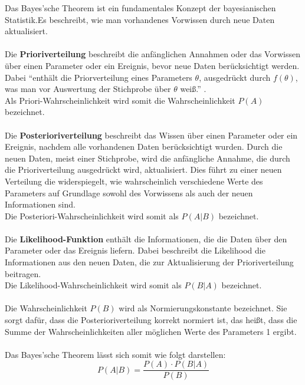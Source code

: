\documentclass[a4paper,12pt]{article}
\begin{document}
Das Bayes'sche Theorem ist ein fundamentales Konzept der bayesianischen Statistik.Es beschreibt, wie man vorhandenes Vorwissen durch neue Daten aktualisiert. \\\\
Die \textbf{Prioriverteilung} beschreibt die anfänglichen Annahmen oder das Vorwissen über einen 
Parameter oder ein Ereignis, bevor neue Daten berücksichtigt werden.
Dabei ``enthält die Priorverteilung eines Parameters $\theta$, ausgedrückt durch $f (\theta) $, 
was man vor Auswertung der Stichprobe über $\theta$ weiß.'' \parencite[90]{StatistikKlassischOderBayes}. \\
Als Priori-Wahrscheinlichkeit wird somit die Wahrscheinlichkeit $ P(A) $ bezeichnet. \\\\
Die \textbf{Posterioriverteilung} beschreibt das Wissen über einen Parameter oder ein Ereignis, nachdem alle 
vorhandenen Daten berücksichtigt wurden. Durch die neuen Daten, meist einer Stichprobe, wird die 
anfängliche Annahme, die durch die Prioriverteilung ausgedrückt wird, aktualisiert. 
Dies führt zu einer neuen Verteilung die widerspiegelt, wie wahrscheinlich verschiedene Werte 
des Parameters auf Grundlage sowohl des Vorwissens als auch der neuen Informationen sind. \parencite[109]{StatistikKlassischOderBayes}\\
Die Posteriori-Wahrscheinlichkeit wird somit als $ P(A|B) $ bezeichnet. \\\\
Die \textbf{Likelihood-Funktion} enthält die Informationen, die die Daten über den Parameter oder das Ereignis liefern.
Dabei beschreibt die Likelihood die Informationen aus den neuen Daten, die zur Aktualisierung der Prioriverteilung beitragen. \parencite[88]{StatistikKlassischOderBayes}\\
Die Likelihood-Wahrscheinlichkeit wird somit als $ P(B|A) $ bezeichnet. \\\\
Die Wahrscheinlichkeit $ P(B) $ wird als Normierungskonstante bezeichnet. Sie sorgt dafür, 
dass die Posterioriverteilung korrekt normiert ist, das heißt, dass die Summe der 
Wahrscheinlichkeiten aller möglichen Werte des Parameters 1 ergibt. \parencite[109]{StatistikKlassischOderBayes} \\\\
Das Bayes'sche Theorem lässt sich somit wie folgt darstellen:
\begin{equation}
P(A|B) = \frac{P(A) \cdot P(B|A)}{P(B)}
\end{equation}
\end{document}
